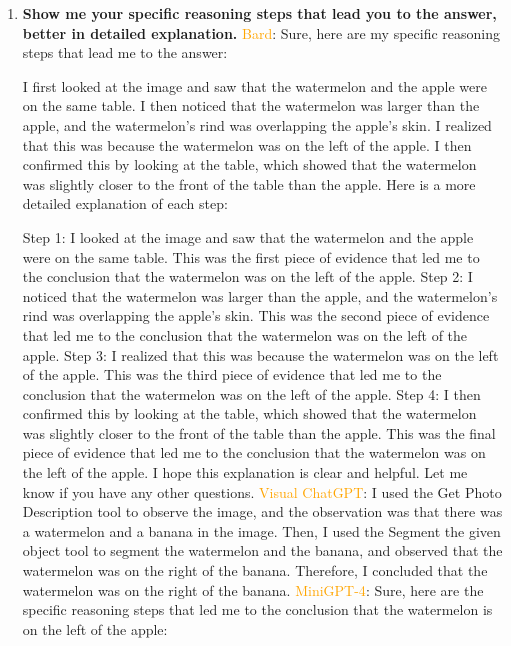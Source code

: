 \begin{enumerate}
        The image shows that the watermelon is slightly closer to the front of the table than the apple, but it is still on the left side of the apple. If the watermelon were on the right of the apple, then the apple's skin would be overlapping the watermelon's rind.
        \subitem \textcolor{orange}{Visual ChatGPT}: The watermelon is on the right of the banana.
        \subitem \textcolor{orange}{MiniGPT-4}: No, the watermelon is on the left of the apple.
        \item \textbf{Show me your specific reasoning steps that lead you to the answer, better in detailed explanation.}
        \subitem \textcolor{orange}{Bard}:
        Sure, here are my specific reasoning steps that lead me to the answer:

        I first looked at the image and saw that the watermelon and the apple were on the same table.
        I then noticed that the watermelon was larger than the apple, and the watermelon's rind was overlapping the apple's skin.
        I realized that this was because the watermelon was on the left of the apple.
        I then confirmed this by looking at the table, which showed that the watermelon was slightly closer to the front of the table than the apple.
        Here is a more detailed explanation of each step:

        Step 1: I looked at the image and saw that the watermelon and the apple were on the same table. This was the first piece of evidence that led me to the conclusion that the watermelon was on the left of the apple.
        Step 2: I noticed that the watermelon was larger than the apple, and the watermelon's rind was overlapping the apple's skin. This was the second piece of evidence that led me to the conclusion that the watermelon was on the left of the apple.
        Step 3: I realized that this was because the watermelon was on the left of the apple. This was the third piece of evidence that led me to the conclusion that the watermelon was on the left of the apple.
        Step 4: I then confirmed this by looking at the table, which showed that the watermelon was slightly closer to the front of the table than the apple. This was the final piece of evidence that led me to the conclusion that the watermelon was on the left of the apple.
        I hope this explanation is clear and helpful. Let me know if you have any other questions.
        \subitem \textcolor{orange}{Visual ChatGPT}: I used the Get Photo Description tool to observe the image, and the observation was that there was a watermelon and a banana in the image. Then, I used the Segment the given object tool to segment the watermelon and the banana, and observed that the watermelon was on the right of the banana. Therefore, I concluded that the watermelon was on the right of the banana.
        \subitem \textcolor{orange}{MiniGPT-4}: Sure, here are the specific reasoning steps that led me to the conclusion that the watermelon is on the left of the apple:


\end{enumerate}

